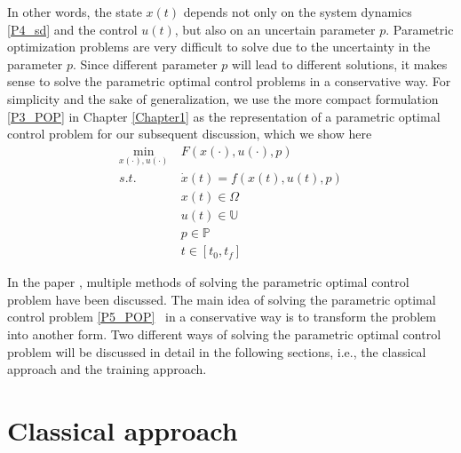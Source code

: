 \documentclass  [
  paper    = a4,
  BCOR     = 10mm,
  twoside,
  fontsize = 12pt,
  fleqn,
  toc      = bibnumbered,
  toc      = listofnumbered,
  numbers  = noendperiod,
  headings = normal,
  listof   = leveldown,
  version  = 3.03
]                                       {scrreprt}
\newcommand{\<}{\langle}
\renewcommand{\>}{\rangle}
\begin{document}
In other words, the state $x(t)$ depends not only on the system dynamics \ref{P4_sd} and the control $u(t)$, but also on an uncertain parameter $p$. Parametric optimization problems are very difficult to solve due to the uncertainty in the parameter $p$. Since different parameter $p$ will lead to different solutions, it makes sense to solve the parametric optimal control problems in a conservative way. For simplicity and the sake of generalization, we use the more compact formulation \ref{P3_POP} in Chapter \ref{Chapter1} as the representation of a parametric optimal control problem for our subsequent discussion, which we show here
      \begin{equation}
	\begin{aligned}
	\underset{x(\cdot), u(\cdot)}{\text{min}}  \ &  F(x(\cdot), u(\cdot), p) \\
	s.t.\ \  &  \dot{x} (t) = f(x(t), u(t), p)\\ 
	& x(t) \in \Omega \\
	& u(t) \in \mathbb{U}  \\
	& p  \in   \mathbb{P}  \\
	& t \in [t_0, t_f]
\end{aligned}
	\label{P5_POP}
\end{equation}

In the paper \cite{MatSch22}, multiple methods of solving the parametric optimal control problem have been discussed. The main idea of solving the parametric optimal control problem \ref{P5_POP}  in a conservative way is to transform the problem into another form. Two different ways of solving the parametric optimal control problem will be discussed in detail in the following sections, i.e., the classical approach and the training approach.

\section{Classical approach}
\label{Sec:CA}
\end{document}
